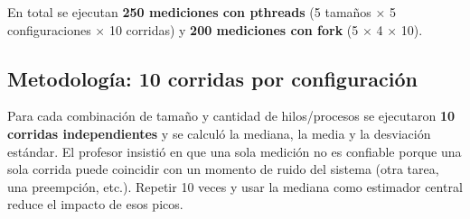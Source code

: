 En total se ejecutan \textbf{250 mediciones con pthreads} (5 tamaños × 5 configuraciones × 10 corridas) y \textbf{200 mediciones con fork} (5 × 4 × 10).

\subsection{Metodología: 10 corridas por configuración}

Para cada combinación de tamaño y cantidad de hilos/procesos se ejecutaron \textbf{10 corridas independientes} y se calculó la mediana, la media y la desviación estándar. El profesor insistió en que una sola medición no es confiable porque una sola corrida puede coincidir con un momento de ruido del sistema (otra tarea, una preempción, etc.). Repetir 10 veces y usar la mediana como estimador central reduce el impacto de esos picos.

